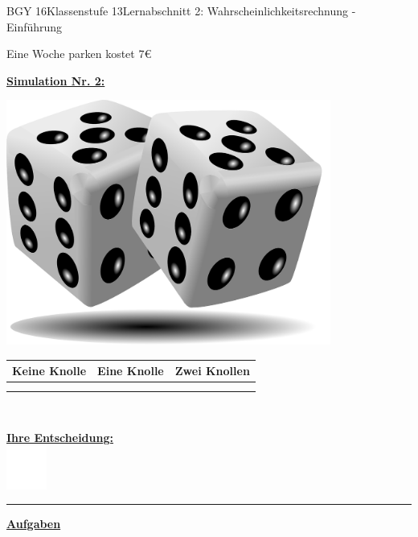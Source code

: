 \documentclass[oneside,openany,headings=optiontotoc,11pt,numbers=noenddot]{scrreprt}
\begin{document}
\begin{worksheet}{BGY 16}{Klassenstufe 13}{Lernabschnitt 2: Wahrscheinlichkeitsrechnung - Einführung}
\begin{framed}
\begin{minipage}{0.68\textwidth}
				\tiny{\color{codegray}{Quelle: https://xkcd.com/562/}}
			\end{minipage}
			\normalsize
			\par\noindent
			\Large{Eine Woche parken kostet \(7\)\euro}\\
			\par\noindent
		\end{framed}
		\noindent
		\underline{\textbf{Simulation Nr. 2:}}\\
		\par\noindent
		\begin{minipage}{0.15\textwidth}
			\includegraphics[width=0.8\textwidth]{../99_Bilder/04_WKR/dice.png}
		\end{minipage}
		\hfill
		\begin{minipage}{0.88\textwidth}
			\begin{tabularx}{0.95\textwidth}{|X|X|X|}
				\hline
				\textbf{Keine Knolle} & \textbf{Eine Knolle} & \textbf{Zwei Knollen} \\
				\hline
				& & \\
				& & \\
				\hline
			\end{tabularx}
		\end{minipage}\\
		\par\noindent
		\underline{\textbf{Ihre Entscheidung:}}\\
		\includegraphics[width=0.1\textwidth]{../../empty.jpg}\\
		\rule{\textwidth}{0.1pt}
		\underline{\textbf{Aufgaben}}\\

\end{worksheet}
\end{document}
